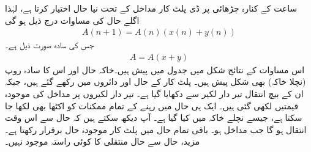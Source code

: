  ساعت کے کنارہ چڑھائی پر ڈی پلٹ کار مداخل کے تحت نیا حال اختیار کرتا ہے، لہٰذا اگلے حال کی مساوات درج ذیل ہو گی
\begin{align*}
A(n+1)=A(n)(x(n)+y(n))
\end{align*}
جس کی سادہ صورت ذیل ہے۔
\begin{align*}
A=A(x+y)
\end{align*}
اس مساوات کے نتائج شکل  میں جدول میں پیش ہیں۔خاکہ حال اور اس کا سادہ روپ (نچلا خاکہ) بھی شکل پیش ہیں۔ پلٹ کار کے حال  اور  دائروں میں رکھے گئے ہیں، جبکہ ان کے بیچ انتقال تیر دار لکیر سے دکھایا گیا ہے۔ تیر دار لکیروں پر مداخل  کی موجودہ قیمتیں لکھی گئی ہیں۔ ایک ہی حال میں رہنے کے تمام ممکنات کو اکٹھا بھی لکھا جا سکتا ہے، جیسے نچلے خاکہ میں کیا گیا ہے۔ آپ دیکھ سکتے ہیں کہ حال  سے  اس وقت انتقال ہو گا جب مداخل  ہو۔ باقی تمام حال میں پلٹ کار موجودہ حال برقرار رکھتا ہے۔مزید، حال  سے حال  منتقلی کا کوئی راستہ موجود نہیں۔

